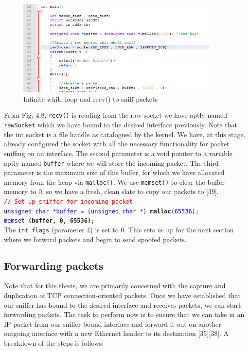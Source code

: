 \documentclass{uathesis}
\begin{document}
\begin{figure}[h!]
    \centering
    \includegraphics[width=0.9\textwidth]{InfiniteSniff.PNG}
    \caption{Infinite while loop and recv() to sniff packets}
    \label{fig: Recv} 
\end{figure}
                 
From Fig: 4.8, {\tt recv()} is reading from the raw socket we have aptly named {\tt rawSocket} which we have bound to the desired interface previously. Note that the int socket is a file handle as catalogued by the kernel. We have, at this stage, already configured the socket with all the necessary functionality for packet sniffing on an interface. The second parameter is a void pointer to a variable aptly named {\tt buffer} where we will store the incoming packet. The third parameter is the maximum size of this buffer, for which we have allocated memory from the heap via {\tt malloc()}. We use {\tt memset()} to clear the buffer memory to 0, so we have a fresh, clean slate to copy our packets to [39]. \\


{\tt \textcolor{red}{// Set up sniffer for incoming packet}\\     
   \textcolor{blue}{unsigned char *buffer = (unsigned char *)} \textbf{malloc}\textcolor{blue}{(65536);} \\
   \textcolor{blue}{memset} \textbf{(buffer, 0, 65536)};} \\
   
The {\tt int flags} (parameter 4) is set to 0.  This sets us up for the next section where we forward packets and begin to send spoofed packets. 

\subsection{Forwarding packets}
Note that for this thesis, we are primarily concerned with the capture and duplication of TCP connection-oriented packets. Once we have established that our sniffer has bound to the desired interface and receives packets, we can start forwarding packets. The task to perform now is to ensure that we can take in an IP packet from our sniffer bound interface and forward it out on another outgoing interface with a new Ethernet header to its destination [35][38]. A breakdown of the steps is follows:\\
\end{document}
